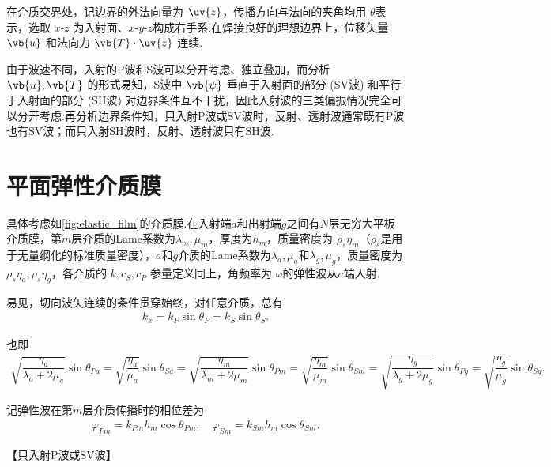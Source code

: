 在介质交界处，记边界的外法向量为 \(\uv{z}\)，传播方向与法向的夹角均用 \(\theta\)表示，选取 \(x\text{-}z\) 为入射面、\(x\text{-}y\text{-}z\)构成右手系.在焊接良好的理想边界上，位移矢量 \(\vb{u}\) 和法向力 \(\vb{T} \cdot \uv{z}\) 连续.

由于波速不同，入射的P波和S波可以分开考虑、独立叠加，而分析 \(\vb{u}, \vb{T}\) 的形式易知，S波中 \(\vb{\psi}\) 垂直于入射面的部分 (SV波) 和平行于入射面的部分 (SH波) 对边界条件互不干扰，因此入射波的三类偏振情况完全可以分开考虑.再分析边界条件知，只入射P波或SV波时，反射、透射波通常既有P波也有SV波；而只入射SH波时，反射、透射波只有SH波.

\section{平面弹性介质膜}

具体考虑如\cref{fig:elastic_film}的介质膜.在入射端\(a\)和出射端\(g\)之间有\(N\)层无穷大平板介质膜，第\(m\)层介质的Lame系数为\(\lambda_m, \mu_m\)，厚度为\(h_m\)，质量密度为 \(\rho_s \eta_m\)（\(\rho_s\)是用于无量纲化的标准质量密度），\(a\)和\(g\)介质的Lame系数为\(\lambda_a, \mu_a\)和\(\lambda_g, \mu_g\)，质量密度为 \(\rho_s \eta_a, \rho_s \eta_g\)，各介质的 \(k, c_S, c_P\) 参量定义同上，角频率为 \(\omega\)的弹性波从\(a\)端入射.

易见，切向波矢连续的条件贯穿始终，对任意介质，总有
\begin{align*}
	k_x = k_P \sin\theta_P = k_S \sin\theta_S.
\end{align*}

也即
\begin{align*}
	\sqrt{\dfrac{\eta_a}{\lambda_a + 2\mu_a}} \sin\theta_{Pa} = \sqrt{\dfrac{\eta_a}{\mu_a}} \sin\theta_{Sa} = \sqrt{\dfrac{\eta_m}{\lambda_m + 2\mu_m}} \sin\theta_{Pm} = \sqrt{\dfrac{\eta_m}{\mu_m}} \sin\theta_{Sm} = \sqrt{\dfrac{\eta_g}{\lambda_g + 2\mu_g}} \sin\theta_{Pg} = \sqrt{\dfrac{\eta_g}{\mu_g}} \sin\theta_{Sg}.
\end{align*}

记弹性波在第\(m\)层介质传播时的相位差为
\begin{align*}
	\varphi_{Pm} = k_{Pm} h_m \cos\theta_{Pm}, \quad \varphi_{Sm} = k_{Sm} h_m \cos\theta_{Sm}.
\end{align*}

【只入射P波或SV波】

